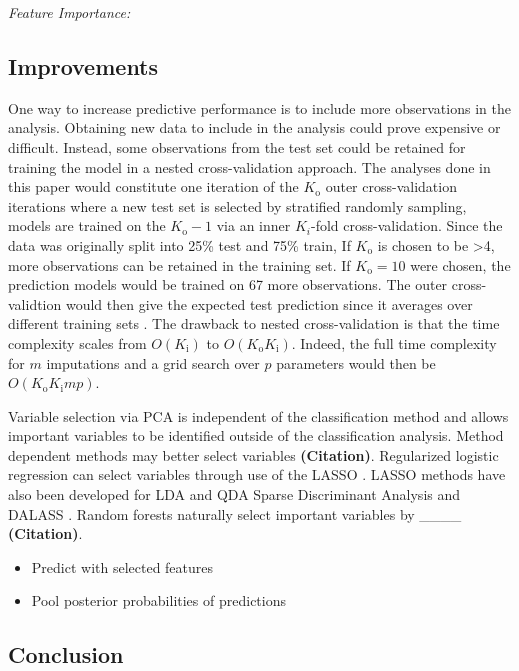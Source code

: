 \documentclass[12pt,]{article}
\providecommand{\tightlist}{%
  \setlength{\itemsep}{0pt}\setlength{\parskip}{0pt}}
\begin{document}
\emph{Feature Importance:}

\subsection{Improvements}\label{improvements}

One way to increase predictive performance is to include more
observations in the analysis. Obtaining new data to include in the
analysis could prove expensive or difficult. Instead, some observations
from the test set could be retained for training the model in a nested
cross-validation approach. The analyses done in this paper would
constitute one iteration of the \(K_\text{o}\) outer cross-validation
iterations where a new test set is selected by stratified randomly
sampling, models are trained on the \(K_\text{o}-1\) via an inner
\(K_{i}\)-fold cross-validation. Since the data was originally split
into 25\% test and 75\% train, If \(K_\text{o}\) is chosen to be
\textgreater{}4, more observations can be retained in the training set.
If \(K_\text{o}=10\) were chosen, the prediction models would be trained
on 67 more observations. The outer cross-validtion would then give the
expected test prediction since it averages over different training sets
\autocite{hastie_elements_2009}. The drawback to nested cross-validation
is that the time complexity scales from \(O(K_\text{i})\) to
\(O(K_\text{o}K_\text{i})\). Indeed, the full time complexity for \(m\)
imputations and a grid search over \(p\) parameters would then be
\(O(K_\text{o}K_\text{i}mp)\).

Variable selection via PCA is independent of the classification method
and allows important variables to be identified outside of the
classification analysis. Method dependent methods may better select
variables \textbf{(Citation)}. Regularized logistic regression can
select variables through use of the LASSO
\autocite{tibshirani_regression_1996}. LASSO methods have also been
developed for LDA and QDA Sparse Discriminant Analysis
\autocite{clemmensen_sparse_2011} and DALASS
\autocite{trendafilov_dalass:_2007}. Random forests naturally select
important variables by \_\_\_\_ \textbf{(Citation)}.

\begin{itemize}
\tightlist
\item
  Predict with selected features
\item
  Pool posterior probabilities of predictions
\end{itemize}

\subsection{Conclusion}\label{conclusion}
\end{document}
